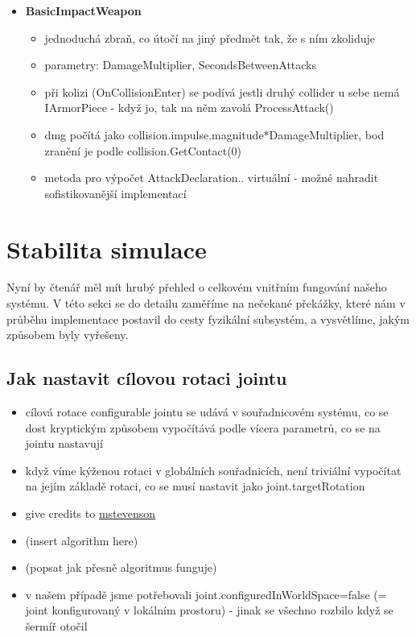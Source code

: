 \begin{itemize}
\begin{itemize}
      \end{itemize} 
  \item \textbf{BasicImpactWeapon}
      \begin{itemize}
        \item jednoduchá zbraň, co útočí na jiný předmět tak, že s ním zkoliduje 
        \item parametry: DamageMultiplier, SecondsBetweenAttacks
        \item při kolizi (OnCollisionEnter) se podívá jestli druhý collider u sebe nemá IArmorPiece - když jo, tak na něm zavolá ProcessAttack()
        \item dmg počítá jako collision.impulse.magnitude*DamageMultiplier, bod zranění je podle collision.GetContact(0)
        \item metoda pro výpočet AttackDeclaration.. virtuální - možné nahradit sofistikovanější implementací
      \end{itemize} 
  
\end{itemize}


\section{Stabilita simulace} \label{simulationStabilitySection}

Nyní by čtenář měl mít hrubý přehled o celkovém vnitřním fungování našeho systému. V této sekci se do detailu zaměříme na nečekané překážky, které nám v průběhu implementace postavil do cesty fyzikální subsystém, a vysvětlíme, jakým způsobem byly vyřešeny.


\subsection{Jak nastavit cílovou rotaci jointu} \label{howToSetJointsTargetRotationSection}
\begin{itemize}
  \item cílová rotace configurable jointu se udává v souřadnicovém systému, co se dost kryptickým způsobem vypočítává podle vícera parametrů, co se na jointu nastavují
  \item když víme kýženou rotaci v globálních souřadnicích, není triviální vypočítat na jejím základě rotaci, co se musí nastavit jako joint.targetRotation
  \item give credits to \href{https://gist.github.com/mstevenson/4958837}{mstevenson}
  \item (insert algorithm here)
  \item (popsat jak přesně algoritmus funguje)
  \item v našem případě jsme potřebovali joint.configuredInWorldSpace=false (= joint konfigurovaný v lokálním prostoru) - jinak se všechno rozbilo když se šermíř otočil 
\end{itemize}

